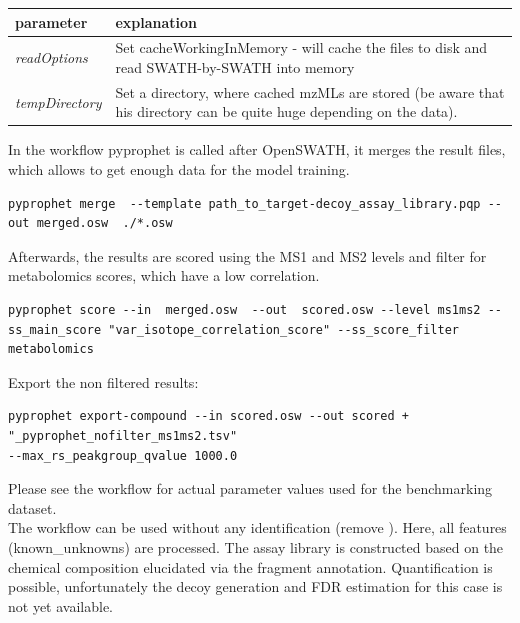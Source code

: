 \begin{center}
\begin{tabular*}{\textwidth}{ p{5.5cm}|p{10.5cm} }
\textbf{parameter} & \textbf{explanation} \\ \hline
\textit{readOptions} & Set cacheWorkingInMemory - will cache the files to disk and read SWATH-by-SWATH into memory\\
\textit{tempDirectory} &  Set a directory, where cached mzMLs are stored (be aware that his directory can be quite huge depending on the data). \\
\end{tabular*}
\end{center} 

\noindent In the workflow pyprophet is called after OpenSWATH, it merges the result files, which allows to get enough data for the model training. 

\begin{lstlisting}
pyprophet merge  --template path_to_target-decoy_assay_library.pqp --out merged.osw  ./*.osw
\end{lstlisting}

\noindent Afterwards, the results are scored using the MS1 and MS2 levels and filter for metabolomics scores, which have a low correlation. 

\begin{lstlisting}
pyprophet score --in  merged.osw  --out  scored.osw --level ms1ms2 --ss_main_score "var_isotope_correlation_score" --ss_score_filter metabolomics
\end{lstlisting}
\noindent Export the non filtered results: 

\begin{lstlisting}
pyprophet export-compound --in scored.osw --out scored + "_pyprophet_nofilter_ms1ms2.tsv" 
--max_rs_peakgroup_qvalue 1000.0
\end{lstlisting}
\noindent Please see the workflow for actual parameter values used for the benchmarking dataset. \\


\noindent  The workflow can be used without any identification (remove ). Here, all features (known\_unknowns) are processed. The assay library is constructed based on the chemical composition elucidated via the fragment annotation. Quantification is possible, unfortunately the decoy generation and FDR estimation for this case is not yet available. 


